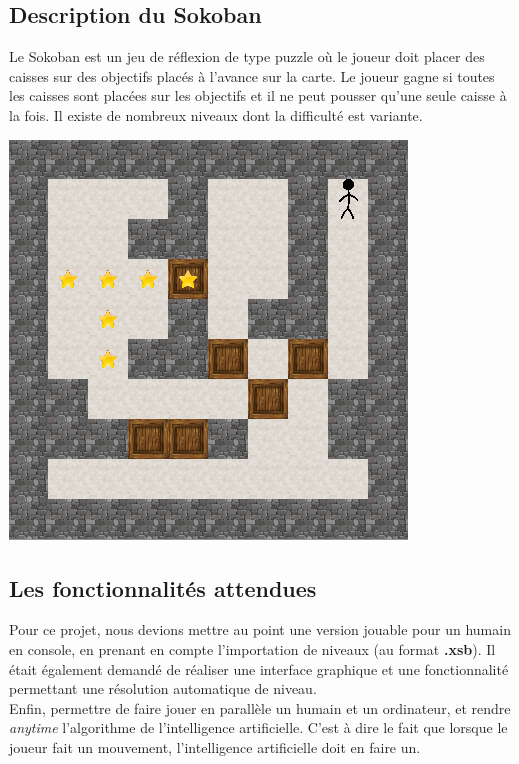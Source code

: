 \documentclass[a4paper,12pt]{article} %
\begin{document}
\subsection*{Description du Sokoban}

Le Sokoban est un jeu de réflexion de type puzzle où le joueur doit placer des caisses sur des objectifs placés à l'avance sur la carte. Le joueur gagne si toutes les caisses sont placées sur les objectifs et il ne peut pousser qu'une seule caisse à la fois. Il existe de nombreux niveaux dont la difficulté est variante.

\begin{center}
\includegraphics[scale=0.5]{images/sokoban.png}
\end{center}

\subsection*{Les fonctionnalités attendues}

Pour ce projet, nous devions mettre au point une version jouable pour un humain en console, en prenant en compte l'importation de niveaux (au format \textbf{.xsb}). Il était également demandé de réaliser une interface graphique et une fonctionnalité permettant une résolution automatique de niveau.\\
Enfin, permettre de faire jouer en parallèle un humain et un ordinateur, et rendre \textit{anytime} l'algorithme de l'intelligence artificielle. C'est à dire le fait que lorsque le joueur fait un mouvement, l'intelligence artificielle doit en faire un.
\end{document}
